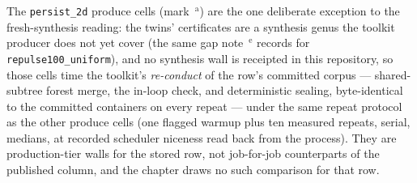 The \texttt{persist\_2d} produce cells (mark~$^{\text{a}}$) are the one
deliberate exception to the fresh-synthesis reading: the twins'
certificates are a synthesis genus the toolkit producer does not yet
cover (the same gap note~$^{\text{e}}$ records for
\texttt{repulse100\_uniform}), and no synthesis wall is receipted in
this repository, so those cells time the toolkit's \emph{re-conduct} of
the row's committed corpus --- shared-subtree forest merge, the in-loop
check, and deterministic sealing, byte-identical to the committed
containers on every repeat --- under the same repeat protocol as the
other produce cells (one flagged warmup plus ten measured repeats,
serial, medians, at recorded scheduler niceness read back from the
process). They are production-tier walls for the stored row, not
job-for-job counterparts of the published column, and the chapter draws
no such comparison for that row.

